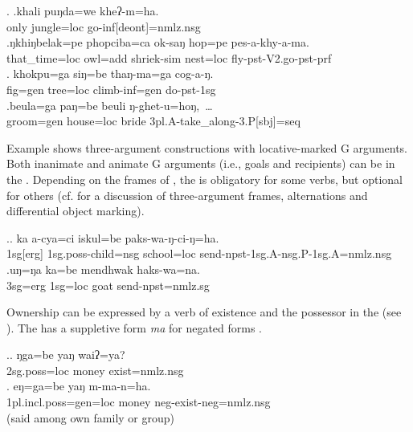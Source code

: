 	 \ex. \ag.khali puŋda=we  kheʔ-m=ha.\\
	only jungle{\sc =loc} go-{\sc inf[deont]=nmlz.nsg}		\\
	  
\bg.ŋkhiŋbelak=pe   phopciba=ca        ok-saŋ          hop=pe     pes-a-khy-a-ma.\\
that\_time{\sc =loc} owl{\sc =add} shriek{\sc -sim} nest{\sc =loc} fly{\sc [3sg]-pst-V2.go-pst-prf}\\
	 
\newpage
	\bg. khokpu=ga      siŋ=be    thaŋ-ma=ga       cog-a-ŋ.\\
fig{\sc =gen} tree{\sc =loc} climb{\sc -inf=gen} do{\sc -pst-1sg}\\
	 
	\bg.beula=ga    paŋ=be     beuli ŋ-ghet-u=hoŋ,~\dots\\
	groom{\sc =gen} house{\sc =loc} bride {\sc 3pl.A-}take\_along{\sc -3.P[sbj]=seq}\\


Example \Next shows three-argument constructions with loca\-tive-mar\-ked G arguments. Both inanimate and animate G arguments  (i.e., goals and recipients) can be in the . Depending on the frames of , the  is obligatory for some verbs, but optional for others (cf.  for a discussion of three-argument frames, alternations and differential object marking).
 
\ex.\ag. ka a-cya=ci iskul=be paks-wa-ŋ-ci-ŋ=ha.\\
	{\sc 1sg[erg]} {\sc 1sg.poss}-child{\sc =nsg} school{\sc =loc} send-{\sc npst-1sg.A-nsg.P-1sg.A=nmlz.nsg}\\
	\bg.uŋ=ŋa ka=be mendhwak haks-wa=na.\\
	{\sc 3sg=erg} {\sc 1sg=loc} goat send{\sc [3sg.A;3.P]-npst=nmlz.sg}\\

Ownership can be expressed by a verb of existence and the possessor in the  (see \Next). The  has a suppletive form \emph{ma} for negated forms \Next[b]. 

\ex.\ag. ŋga=be yaŋ waiʔ=ya?\\
{\sc 2sg.poss=loc} money exist{\sc [3sg;npst]=nmlz.nsg}\\
\bg. eŋ=ga=be yaŋ m-ma-n=ha.\\
		{\sc 1pl.incl.poss=gen=loc} money {\sc neg-}exist{\sc [3;npst]-neg=nmlz.nsg}	\\
	 (said among own family or group)

